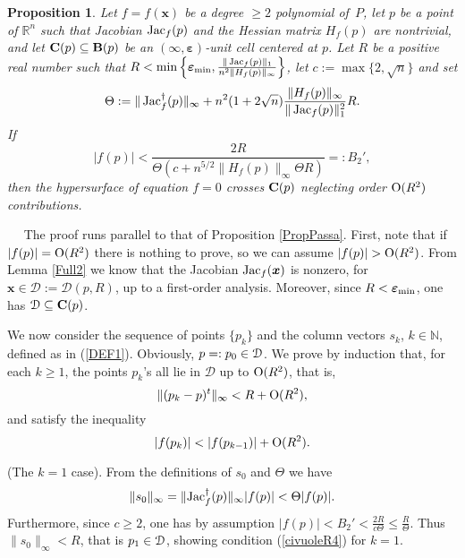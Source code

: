 \documentclass[10pt]{article}
\newcommand\sD{{\cal D}}
\newcommand{\x}{{\bm x}}
\newcommand\proof{\noindent{\em Proof.}\ \ } \newcommand\mult{\mbox{\rm mult}}
\newcommand\N{{\mathbb N}}
\newcommand\R{{\mathbb R}}
\newcommand{\epsbold}{{\bm \varepsilon}}
\def\Jac{\mathop{\rm Jac}\nolimits}
\newtheorem{prop}[theorem]{Proposition}
\begin{document}
{\begin{prop}\label{PropPassa2}
Let $f=f(\x)$ be a degree $\geq 2$ polynomial of~$P$,
let $p$ be a point of $\R^n$ such that  Jacobian $\Jac_f(p)$ and the Hessian matrix $H_f(p)$ are nontrivial, 
and let ${\bf C}(p) \subseteq {\bf B}(p)$
be an $(\infty,\epsbold)$-unit cell  centered at $p$.
Let $R$ be a positive real number such that
$R < \min \left \{\epsbold_{\rm min}, \frac{\|\Jac_f(p)\|_1}{n^2 \|H_f(p)\|_\infty} \right\}$, 
let $c:=\max\{2, \sqrt{n}\}$ and set 
$$
\Theta:=  \|\Jac_f^\dagger(p)\|_\infty+  n^2(1+2 \sqrt{n}) \frac{\|H_f(p)\|_\infty}{\|\Jac_f(p)\|_1^2} R.
$$
If 
\begin{equation}
|f(p)| < \frac{2R}{\Theta (c+  n^{5/2} \|H_f(p)\|_\infty \Theta R)} =:B_2',
\end{equation}
then the hypersurface of equation $f=0$ crosses ${\bf C}(p)$  neglecting order ${\rm O}(R^2)$ contributions.
\end{prop}
\proof 
The proof runs parallel to that of Proposition \ref{PropPassa}. First, note that if $|f(p)|={\rm O}(R^2)$ there is nothing to prove, so we can assume 
$|f(p)|>{\rm O}(R^2)$.
From Lemma \ref{Full2} we know that  the Jacobian $\Jac_f(\bm x)$ is nonzero, 
for  $\x \in \mathcal D:=\mathcal D(p, R)$, up to a first-order analysis.
Moreover, since $R< \epsbold_{\rm min}$, one has $\sD\subseteq \mathcal {\bf C}(p)$.

We now consider the sequence of points $\{p_k\}$ and the column vectors $s_k$, $k\in \N$, defined  as in (\ref{DEF1}). 
Obviously, $p=:p_0\in \sD$. We prove by induction that,   for each $k\geq 1$, the points  $p_k$'s all lie in $ \mathcal D$  up to ${\rm O}(R^2)$, that is,
\begin{equation}\label{civuoleR4} 
\| (p_k-p)^t\|_\infty<R+{\rm O}(R^2),
\end{equation}
and satisfy the  inequality 
 \begin{equation}\label{civuoleR2}
 |f(p_k)| <  |f(p_{k-1})|+{\rm O}(R^2).\end{equation}


 (The $k=1$ case). 
From the definitions of $s_0$ and $\Theta$ we have
$$
\|s_0\|_\infty = \|{\rm Jac}_f^\dagger(p)\|_\infty |f(p)| < \Theta |f(p)|.
$$
Furthermore,  since $c \geq 2$,  one  has by assumption
$|f(p)| <B_2' < \frac{2 R}{c \Theta} \le \frac{R}{\Theta}$.  Thus $\|s_0\|_\infty < R$, that is $p_1\in \sD$, showing condition (\ref{civuoleR4}) for $k=1$.

}
\end{document}
